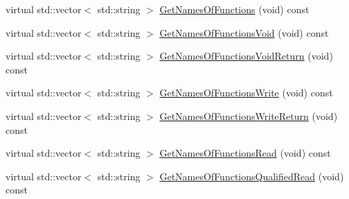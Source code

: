 {\bf }\par
\begin{DoxyCompactItemize}
\item 
virtual std\-::vector$<$ std\-::string $>$ \hyperlink{classmts_interface_required_ab754a787c59ec469d69833bdbf6d1399}{Get\-Names\-Of\-Functions} (void) const 
\item 
virtual std\-::vector$<$ std\-::string $>$ \hyperlink{classmts_interface_required_a197e2980d3cf58141ef369b6f866a661}{Get\-Names\-Of\-Functions\-Void} (void) const 
\item 
virtual std\-::vector$<$ std\-::string $>$ \hyperlink{classmts_interface_required_a9858da8cb7928f85f237e044ce23901d}{Get\-Names\-Of\-Functions\-Void\-Return} (void) const 
\item 
virtual std\-::vector$<$ std\-::string $>$ \hyperlink{classmts_interface_required_af8789b5b4db6e6acad15b2598238808c}{Get\-Names\-Of\-Functions\-Write} (void) const 
\item 
virtual std\-::vector$<$ std\-::string $>$ \hyperlink{classmts_interface_required_a8bd333d2df5727af6e8ba28a407865ad}{Get\-Names\-Of\-Functions\-Write\-Return} (void) const 
\item 
virtual std\-::vector$<$ std\-::string $>$ \hyperlink{classmts_interface_required_ae51957b52fbe757e0750ed406bb064b3}{Get\-Names\-Of\-Functions\-Read} (void) const 
\item 
virtual std\-::vector$<$ std\-::string $>$ \hyperlink{classmts_interface_required_af0f9ccff5325f10d325910afa4f45411}{Get\-Names\-Of\-Functions\-Qualified\-Read} (void) const 
\end{DoxyCompactItemize}


